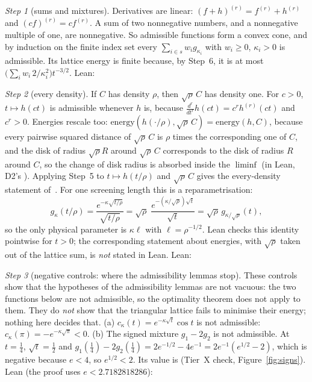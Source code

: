 \documentclass[11pt]{article}
\theoremstyle{remark}
\newtheorem{step}{Step}
\begin{document}
\begin{step}[sums and mixtures]
Derivatives are linear: $(f+h)^{(r)}=f^{(r)}+h^{(r)}$ and $(cf)^{(r)}=cf^{(r)}$. A sum of two nonnegative numbers, and
a nonnegative multiple of one, are nonnegative. So admissible functions form a convex cone, and by induction on the
finite index set every $\sum_{i\in s}w_ig_{\kappa_i}$ with $w_i\ge0$, $\kappa_i>0$ is admissible. Its lattice energy
is finite because, by Step~6, it is at most $\big(\sum_iw_i\,2/\kappa_i^2\big)t^{-3/2}$. Lean:
\end{step}



\begin{step}[every density]
If $C$ has density $\rho$, then $\sqrt\rho\,C$ has density one. For $c>0$, $t\mapsto h(ct)$ is admissible whenever $h$
is, because $\frac{d^r}{dt^r}h(ct)=c^rh^{(r)}(ct)$ and $c^r>0$. Energies rescale too:
$\mathrm{energy}(h(\cdot/\rho),\sqrt\rho\,C)=\mathrm{energy}(h,C)$, because every pairwise squared distance of
$\sqrt\rho\,C$ is $\rho$ times the corresponding one of $C$, and the disk of radius $\sqrt\rho R$ around $\sqrt\rho\,C$
corresponds to the disk of radius $R$ around $C$, so the change of disk radius is absorbed inside the $\liminf$ (in
Lean, D2's ). Applying Step~5 to $t\mapsto h(t/\rho)$ and $\sqrt\rho\,C$ gives the every-density
statement of~\cite{d12}. For one screening length this is a reparametrisation:
\[g_\kappa(t/\rho)=\frac{e^{-\kappa\sqrt{t/\rho}}}{\sqrt{t/\rho}}=\sqrt\rho\;\frac{e^{-(\kappa/\sqrt\rho)\sqrt t}}{\sqrt t}
=\sqrt\rho\,g_{\kappa/\sqrt\rho}(t),\]
so the only physical parameter is $\kappa\ell$ with $\ell=\rho^{-1/2}$. Lean checks this identity pointwise for $t>0$; the
corresponding statement about energies, with $\sqrt\rho$ taken out of the lattice sum, is \emph{not} stated in Lean.
Lean:
\end{step}


\begin{step}[negative controls: where the admissibility lemmas stop]
These controls show that the hypotheses of the admissibility lemmas are not vacuous: the two functions below are not
admissible, so the optimality theorem does not apply to them. They do \emph{not} show that the triangular lattice
fails to minimise their energy; nothing here decides that.
(a) $c_\kappa(t)=e^{-\kappa\sqrt t}\cos t$ is not admissible: $c_\kappa(\pi)=-e^{-\kappa\sqrt\pi}<0$.
(b) The signed mixture $g_1-2g_2$ is not admissible. At $t=\tfrac14$, $\sqrt t=\tfrac12$ and
$g_1(\tfrac14)-2g_2(\tfrac14)=2e^{-1/2}-4e^{-1}=2e^{-1}(e^{1/2}-2)$, which is negative because $e<4$, so $e^{1/2}<2$.
Its value is \MixQuarter{} (Tier~X check, Figure~\ref{fig:signs}). Lean (the proof uses $e<2.7182818286$):
\end{step}


\end{document}

